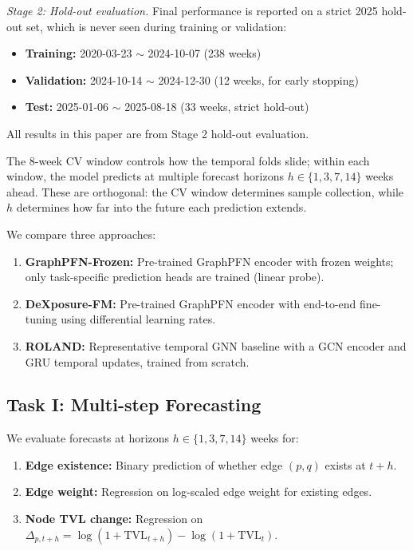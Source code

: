 \documentclass[preprint,12pt]{elsarticle}
\renewcommand{\paragraph}[1]{}
\begin{document}
\textit{Stage 2: Hold-out evaluation.}
Final performance is reported on a strict 2025 hold-out set, which is never seen during training or validation:
\begin{itemize}
  \item \textbf{Training:} 2020-03-23 $\sim$ 2024-10-07 (238 weeks)
  \item \textbf{Validation:} 2024-10-14 $\sim$ 2024-12-30 (12 weeks, for early stopping)
  \item \textbf{Test:} 2025-01-06 $\sim$ 2025-08-18 (33 weeks, strict hold-out)
\end{itemize}
All results in this paper are from Stage 2 hold-out evaluation.

\paragraph{Forecast horizons vs. CV windows.}
The 8-week CV window controls how the temporal folds slide; within each window, the model predicts at multiple forecast horizons $h \in \{1, 3, 7, 14\}$ weeks ahead. These are orthogonal: the CV window determines sample collection, while $h$ determines how far into the future each prediction extends.

\paragraph{Models compared.}
We compare three approaches:
\begin{enumerate}
  \item \textbf{GraphPFN-Frozen:} Pre-trained GraphPFN encoder with frozen weights; only task-specific prediction heads are trained (linear probe).
  \item \textbf{DeXposure-FM:} Pre-trained GraphPFN encoder with end-to-end fine-tuning using differential learning rates.
\item \textbf{ROLAND:} Representative temporal GNN baseline with a GCN encoder and GRU temporal updates, trained from scratch.
\end{enumerate}

\subsection{Task I: Multi-step Forecasting}
\label{subsec:forecast}

\paragraph{Targets.}
We evaluate forecasts at horizons $h \in \{1, 3, 7, 14\}$ weeks for:
\begin{enumerate}
  \item \textbf{Edge existence:} Binary prediction of whether edge $(p,q)$ exists at $t+h$.
  \item \textbf{Edge weight:} Regression on log-scaled edge weight for existing edges.
  \item \textbf{Node TVL change:} Regression on $\Delta_{p,t+h} = \log(1+\text{TVL}_{t+h}) - \log(1+\text{TVL}_t)$.
\end{enumerate}
\end{document}
